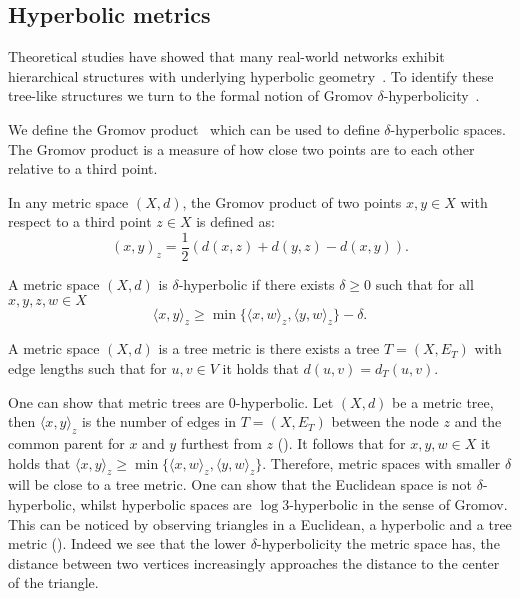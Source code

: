 \subsection{Hyperbolic metrics}
Theoretical studies have showed that many real-world networks exhibit hierarchical structures with underlying hyperbolic geometry~\cite{Krioukov2010HyperbolicGeometryComplexNetworks}\cite{Papadopoulos2012popularityVSSimilarityGrowingNetworks}. To identify these tree-like structures we turn to the formal notion of Gromov $\delta$-hyperbolicity~\cite{gromov1987hyperbolic}\cite{adcock2013tree}\cite{chen2013hyperbolicity}.

We define the Gromov product~\cite{gromov1987hyperbolic} which can be used to define $\delta$-hyperbolic spaces. The Gromov product is a measure of how close two points are to each other relative to a third point.  

\begin{definition}
    In any metric space $(X,d)$, the Gromov product of two points $x,y\in X$ with respect to a third point $z\in X$ is defined as:
    \begin{equation*}
        (x,y)_z = \frac{1}{2}\left(d(x,z) + d(y,z) - d(x,y)\right).
    \end{equation*}
\end{definition}

\begin{definition}
    A metric space $(X,d)$ is $\delta$-hyperbolic if there exists $\delta\geq0$ such that for all $x,y,z,w\in X$
    \begin{equation*}
        \langle x,y\rangle_z \geq \min\{\langle x,w\rangle_z, \langle y, w\rangle_z\} - \delta.
    \end{equation*}
\end{definition}

\begin{definition}
    A metric space $(X,d)$ is a tree metric is there exists a tree $T=(X,E_T)$ with edge lengths such that for $u,v\in V$ it holds that $d(u,v)=d_T(u,v)$.
\end{definition}



One can show that metric trees are $0$-hyperbolic. Let $(X,d)$ be a metric tree, then $\langle x, y\rangle_z$ is the number of edges in $T=(X,E_T)$ between the node $z$ and the common parent for $x$ and $y$ furthest from $z$ (). It follows that for $x,y,w\in X$ it holds that $\langle x,y\rangle_z \geq \min\{\langle x,w\rangle_z, \langle y, w\rangle_z\}$. Therefore, metric spaces with smaller $\delta$ will be close to a tree metric. One can show that the Euclidean space is not $\delta$-hyperbolic, whilst hyperbolic spaces are $\log 3$-hyperbolic in the sense of Gromov. This can be noticed by observing triangles in a Euclidean, a hyperbolic and a tree metric (). Indeed we see that the lower $\delta$-hyperbolicity the metric space has, the distance between two vertices increasingly approaches the distance to the center of the triangle.


